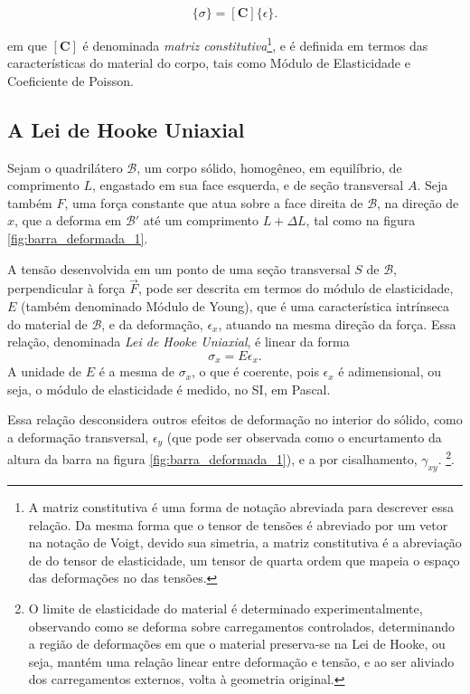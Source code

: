 \begin{equation}
    \{\sigma\} = [\bm{C}] \{\epsilon\}.
    \label{eq:lei_de_hooke}
\end{equation}

em que $[\bm{C}]$ é denominada \emph{matriz constitutiva}\footnote{A matriz constitutiva é uma forma de notação abreviada para descrever essa relação. Da mesma forma que o tensor de tensões é abreviado por um vetor na notação de Voigt, devido sua simetria, a matriz constitutiva é a abreviação de do tensor de elasticidade, um tensor de quarta ordem que mapeia o espaço das deformações no das tensões.}, e é definida em termos das características do material do corpo, tais como Módulo de Elasticidade e Coeficiente de Poisson.

\subsection{A Lei de Hooke Uniaxial}

Sejam o quadrilátero $\mathcal{B}$, um corpo sólido, homogêneo, em equilíbrio, de comprimento $L$, engastado em sua face esquerda, e de seção transversal $A$. Seja também $F$, uma força constante que atua sobre a face direita de $\mathcal{B}$, na direção de $x$, que a deforma em $\mathcal{B}'$ até um comprimento $L+\Delta L$, tal como na figura \ref{fig:barra_deformada_1}. 

A tensão desenvolvida em um ponto de uma seção transversal $S$ de $\mathcal{B}$, perpendicular à força $\vec{F}$, pode ser descrita em termos do módulo de elasticidade, $E$ (também denominado Módulo de Young), que é uma característica intrínseca do material de $\mathcal{B}$, e da deformação, $\epsilon_x$, atuando na mesma direção da força. Essa relação, denominada \emph{Lei de Hooke Uniaxial}, é linear da forma
\begin{equation}
    \sigma_x = E \epsilon_x.
    \label{eq:lei_de_hooke_uniaxial}
\end{equation} 
A unidade de $E$ é a mesma de $\sigma_x$, o que é coerente, pois $\epsilon_x$ é adimensional, ou seja, o módulo de elasticidade é medido, no SI, em Pascal.



Essa relação desconsidera outros efeitos de deformação no interior do sólido, como a deformação transversal, $\epsilon_y$ (que pode ser observada como o encurtamento da altura da barra na figura \ref{fig:barra_deformada_1}), e a por cisalhamento, $\gamma_{xy}$. \footnote{O limite de elasticidade do material é determinado experimentalmente, observando como se deforma sobre carregamentos controlados, determinando a região de deformações em que o material preserva-se na Lei de Hooke, ou seja, mantém uma relação linear entre deformação e tensão, e ao ser aliviado dos carregamentos externos, volta à geometria original.}.

